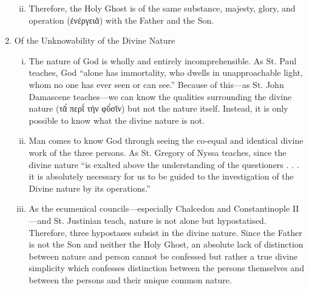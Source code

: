 \begin{enumerate}
\begin{enumerate}[i.]
\begin{enumerate}[a.]
			\end{enumerate}
		\item Therefore, the Holy Ghost is of the same substance, majesty, glory, and operation (ἐνέργειᾰ) with the Father and the Son.
	\end{enumerate}
	\item Of the Unknowability of the Divine Nature
	\begin{enumerate}[i.]
		\item The nature of God is wholly and entirely incomprehensible. As St. Paul teaches, God ``alone has immortality, who dwells in unapproachable light, whom no one has ever seen or can see.'' Because of this---as St. John Damascene teaches---we can know the qualities surrounding the divine nature (τᾰ́ περῐ́ τήν φῠ́σῐν) but not the nature itself. Instead, it is only possible to know what the divine nature is not.
		\item Man comes to know God through seeing the co-equal and identical divine work of the three persons. As St. Gregory of Nyssa teaches, since the divine nature ``is exalted above the understanding of the questioners . . . it is absolutely necessary for us to be guided to the investigation of the Divine nature by its operations.''
		\item As the ecumenical councils---especially Chalcedon and Constantinople II---and St. Justinian teach, nature is not alone but hypostatised. Therefore, three hypostases subsist in the divine nature. Since the Father is not the Son and neither the Holy Ghost, an absolute lack of distinction between nature and person cannot be confessed but rather a true divine simplicity which confesses distinction between the persons themselves and between the persons and their unique common nature.
	\end{enumerate}
\end{enumerate}
